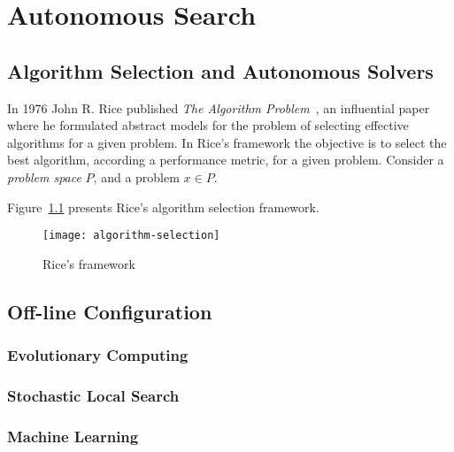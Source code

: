 \chapter{Autonomous Search}
\label{chap:autonomous}

\section{Algorithm Selection and Autonomous Solvers}
\label{sec:algselres}

In 1976 John R. Rice published \textit{The Algorithm
Problem}~\cite{rice1976algorithm}, an influential paper where he formulated
abstract models for the problem of selecting effective algorithms for a given
problem. In Rice's framework the objective is to select the best algorithm,
according a performance metric, for a given problem. Consider a \textit{problem
space} $P$, and a problem $x \in P$.

Figure~\ref{fig:riceframe} presents Rice's algorithm selection
framework.

\begin{figure}[htpb]
    \begin{center}
        \texttt{[image: algorithm-selection]}
    \end{center}
    \caption{Rice's framework}
    \label{fig:riceframe}
\end{figure}


\section{Off-line Configuration}
\label{sec:offconfig}

\subsection{Evolutionary Computing}
\label{subsec:evolcomp}

\subsection{Stochastic Local Search}
\label{subsec:searchsls}

\subsection{Machine Learning}
\label{subsec:searchml}

